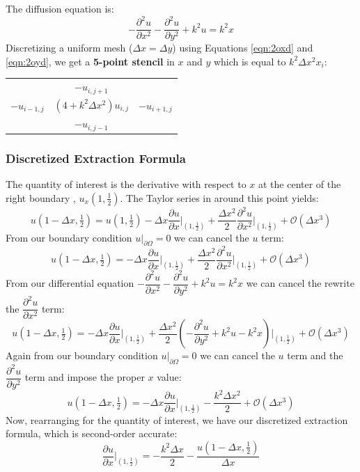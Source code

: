 \documentclass[10pt]{article}		%
\numberwithin{equation}{section}
\newcommand{\pder}[2]{\frac{\partial#1}{\partial#2}}			%
\newcommand{\psder}[2]{\dfrac{\partial^2#1}{\partial#2^2}}		%
\begin{document}
The diffusion equation is:
\begin{equation}
-\psder{u}{x} - \psder{u}{y} +  k^2u = k^2x
\end{equation}
Discretizing a uniform mesh ($\Delta x = \Delta y$) using Equations \ref{eqn:2oxd} and \ref{eqn:2oyd}, we get a \textbf{5-point stencil} in $x$ and $y$ which is equal to $k^2 \Delta x^2 x_i$:

\begin{table}[H]
	\begin{tabular}{ccc}
		& $-u_{i, j+1}$ &  \\
		$-u_{i-1, j}$ & $(4+k^2\Delta x^2)u_{i, j}$ & $-u_{i+1, j}$ \\
		& $-u_{i, j-1}$ & 
	\end{tabular}
\end{table}

\subsubsection{Discretized Extraction Formula}
The quantity of interest is the derivative with respect to $x$ at the center of the right boundary , $u_x(1, \tfrac{1}{2})$.
The Taylor series in around this point yields:
\begin{equation}
u(1-\Delta x, \tfrac{1}{2}) = u(1, \tfrac{1}{2}) - \Delta x \pder{u}{x}\Big|_{\left(1, \tfrac{1}{2}\right)} + \frac{\Delta x^2}{2} \psder{u}{x}\Big|_{\left(1, \tfrac{1}{2}\right)} + \mathcal{O}(\Delta x^3)
\end{equation}
From our boundary condition $u \big|_{\partial \Omega} = 0 $ we can cancel the $u$ term:
\begin{equation}
u(1-\Delta x, \tfrac{1}{2}) = - \Delta x \pder{u}{x}\Big|_{\left(1, \tfrac{1}{2}\right)} + \frac{\Delta x^2}{2} \psder{u}{x}\Big|_{\left(1, \tfrac{1}{2}\right)} + \mathcal{O}(\Delta x^3)
\end{equation}
From our differential equation $-\psder{u}{x} - \psder{u}{y} +  k^2u = k^2x$ we can cancel the rewrite the $\psder{u}{x}$ term:
\begin{equation}
u(1-\Delta x, \tfrac{1}{2}) = - \Delta x \pder{u}{x}\Big|_{\left(1, \tfrac{1}{2}\right)} + \frac{\Delta x^2}{2} \left(- \psder{u}{y} +  k^2u - k^2x\right)\Big|_{\left(1, \tfrac{1}{2}\right)} + \mathcal{O}(\Delta x^3)
\end{equation}
Again from our boundary condition $u \big|_{\partial \Omega} = 0 $ we can cancel the $u$ term and the $\psder{u}{y}$ term and impose the proper $x$ value:
\begin{equation}
u(1-\Delta x, \tfrac{1}{2}) = - \Delta x \pder{u}{x}\Big|_{\left(1, \tfrac{1}{2}\right)} - \frac{k^2\Delta x^2}{2} + \mathcal{O}(\Delta x^3)
\end{equation}
Now, rearranging for the quantity of interest, we have our discretized extraction formula, which is second-order accurate:
\begin{equation}
\pder{u}{x}\Big|_{\left(1, \tfrac{1}{2}\right)} = -\frac{k^2\Delta x}{2} -\frac{u(1-\Delta x, \tfrac{1}{2})}{\Delta x}
\end{equation}
\end{document}
